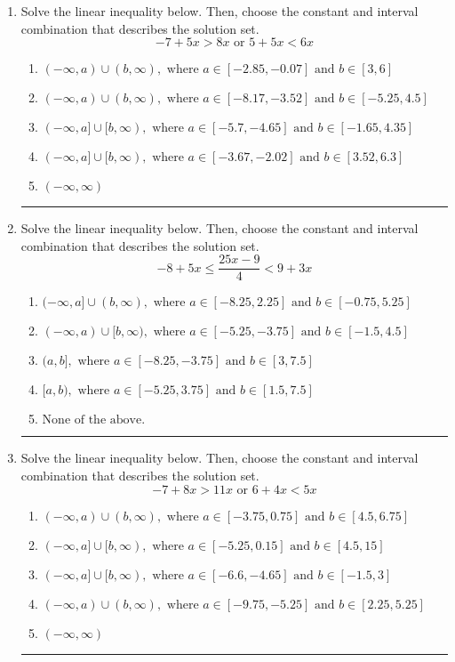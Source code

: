 \documentclass[14pt]{extbook}
\newcommand{\litem}[1]{\item#1\hspace*{-1cm}\rule{\textwidth}{0.4pt}}
\begin{document}
\begin{enumerate}
{\begin{enumerate}[label=\Alph*.]
\end{enumerate} }
\litem{
Solve the linear inequality below. Then, choose the constant and interval combination that describes the solution set.\[ -7 + 5 x > 8 x \text{ or } 5 + 5 x < 6 x \]\begin{enumerate}[label=\Alph*.]
\item \( (-\infty, a) \cup (b, \infty), \text{ where } a \in [-2.85, -0.07] \text{ and } b \in [3, 6] \)
\item \( (-\infty, a) \cup (b, \infty), \text{ where } a \in [-8.17, -3.52] \text{ and } b \in [-5.25, 4.5] \)
\item \( (-\infty, a] \cup [b, \infty), \text{ where } a \in [-5.7, -4.65] \text{ and } b \in [-1.65, 4.35] \)
\item \( (-\infty, a] \cup [b, \infty), \text{ where } a \in [-3.67, -2.02] \text{ and } b \in [3.52, 6.3] \)
\item \( (-\infty, \infty) \)

\end{enumerate} }
\litem{
Solve the linear inequality below. Then, choose the constant and interval combination that describes the solution set.\[ -8 + 5 x \leq \frac{25 x - 9}{4} < 9 + 3 x \]\begin{enumerate}[label=\Alph*.]
\item \( (-\infty, a] \cup (b, \infty), \text{ where } a \in [-8.25, 2.25] \text{ and } b \in [-0.75, 5.25] \)
\item \( (-\infty, a) \cup [b, \infty), \text{ where } a \in [-5.25, -3.75] \text{ and } b \in [-1.5, 4.5] \)
\item \( (a, b], \text{ where } a \in [-8.25, -3.75] \text{ and } b \in [3, 7.5] \)
\item \( [a, b), \text{ where } a \in [-5.25, 3.75] \text{ and } b \in [1.5, 7.5] \)
\item \( \text{None of the above.} \)

\end{enumerate} }
\litem{
Solve the linear inequality below. Then, choose the constant and interval combination that describes the solution set.\[ -7 + 8 x > 11 x \text{ or } 6 + 4 x < 5 x \]\begin{enumerate}[label=\Alph*.]
\item \( (-\infty, a) \cup (b, \infty), \text{ where } a \in [-3.75, 0.75] \text{ and } b \in [4.5, 6.75] \)
\item \( (-\infty, a] \cup [b, \infty), \text{ where } a \in [-5.25, 0.15] \text{ and } b \in [4.5, 15] \)
\item \( (-\infty, a] \cup [b, \infty), \text{ where } a \in [-6.6, -4.65] \text{ and } b \in [-1.5, 3] \)
\item \( (-\infty, a) \cup (b, \infty), \text{ where } a \in [-9.75, -5.25] \text{ and } b \in [2.25, 5.25] \)
\item \( (-\infty, \infty) \)


\end{enumerate}}
\end{enumerate}
\end{document}
